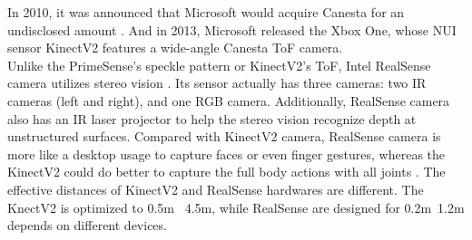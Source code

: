 In 2010, it was announced that Microsoft would acquire Canesta for an undisclosed amount \cite{Canesta_2010}. %
And in 2013,  Microsoft released the Xbox One, whose NUI sensor KinectV2 features a wide-angle Canesta ToF camera.
\\\indent
Unlike the PrimeSense's speckle pattern or KinectV2's ToF, Intel RealSense camera utilizes stereo vision \cite{RealSense01_2015}. Its sensor actually has three cameras: two IR cameras (left and right), and one RGB camera. Additionally, RealSense camera also has an IR laser projector to help the stereo vision recognize depth at unstructured surfaces. Compared with KinectV2 camera, RealSense camera is more like a desktop usage to capture faces or even finger gestures, whereas the KinectV2 could do better to capture the full body actions with all joints \cite{RealSense02_2016}. The effective distances of KinectV2 and RealSense hardwares are different. The KnectV2 is optimized to 0.5m ~4.5m, while RealSense are designed for 0.2m~1.2m depends on different devices.

